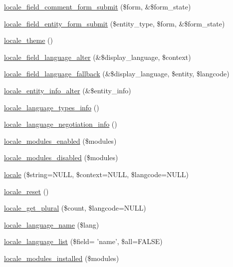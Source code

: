 \begin{DoxyCompactItemize}
\item 
\hyperlink{locale_8module_a9f8d1dee8869eb34d543583be5bbacba}{locale\_\-field\_\-comment\_\-form\_\-submit} (\$form, \&\$form\_\-state)
\item 
\hyperlink{locale_8module_ad748e0a833a557c5435bd386f4b07290}{locale\_\-field\_\-entity\_\-form\_\-submit} (\$entity\_\-type, \$form, \&\$form\_\-state)
\item 
\hyperlink{locale_8module_ac254e72900f872d8999dd7dcea4624bd}{locale\_\-theme} ()
\item 
\hyperlink{locale_8module_a2e2bf06bf347a63df595c58aad152428}{locale\_\-field\_\-language\_\-alter} (\&\$display\_\-language, \$context)
\item 
\hyperlink{locale_8module_a434eb64757d6496331a45365258fbecc}{locale\_\-field\_\-language\_\-fallback} (\&\$display\_\-language, \$entity, \$langcode)
\item 
\hyperlink{locale_8module_a071a656e0a5b2ac777ae4a70bd9258c1}{locale\_\-entity\_\-info\_\-alter} (\&\$entity\_\-info)
\item 
\hyperlink{locale_8module_a8a6568505c70074277a041adbdd8f5f0}{locale\_\-language\_\-types\_\-info} ()
\item 
\hyperlink{locale_8module_a466ecb6aa7c40e3d5811baf3ab50f17b}{locale\_\-language\_\-negotiation\_\-info} ()
\item 
\hyperlink{locale_8module_ad50d372fc041d4058cb1e46de2b25ae8}{locale\_\-modules\_\-enabled} (\$modules)
\item 
\hyperlink{locale_8module_ac749e1e9a3ba377a1620db71f9e43ae0}{locale\_\-modules\_\-disabled} (\$modules)
\item 
\hyperlink{locale_8module_aa8108c8ecfcedbde1cf0d40606d5b2f5}{locale} (\$string=NULL, \$context=NULL, \$langcode=NULL)
\item 
\hyperlink{locale_8module_add57084103803c08125d136031039cdc}{locale\_\-reset} ()
\item 
\hyperlink{locale_8module_a927bf27452f39ef88eca329f10f92761}{locale\_\-get\_\-plural} (\$count, \$langcode=NULL)
\item 
\hyperlink{locale_8module_a1446648d967a237f9476798d8a136a7d}{locale\_\-language\_\-name} (\$lang)
\item 
\hyperlink{locale_8module_a744c64d4144758494d9e552375258a53}{locale\_\-language\_\-list} (\$field= 'name', \$all=FALSE)
\item 
\hyperlink{locale_8module_af50fdbbf6404279f355b1c8e8f215e18}{locale\_\-modules\_\-installed} (\$modules)
\item 

\end{DoxyCompactItemize}
